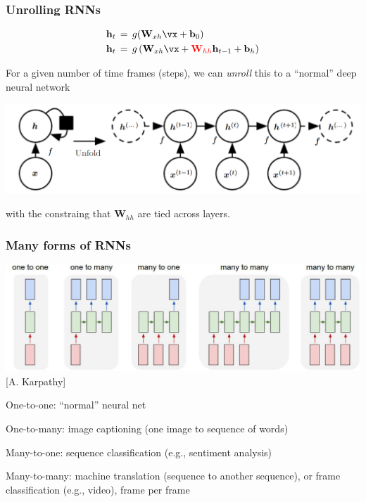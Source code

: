 \documentclass[xcolor=dvipsnames]{beamer}
\begin{document}
\begin{frame}
  \frametitle{Unrolling RNNs}
\begin{align*}
    \mathbf{h}_t\,&=\,g(\mathbf{W}_{xh}\vx+\mathbf{b}_0)\\
    \mathbf{h}_t\,&=\,g\left(\mathbf{W}_{xh}\vx+\textcolor{red}{\mathbf{W}_{hh}}\mathbf{h}_{t-1}+\mathbf{b}_h\right)
  \end{align*}
  \bi
\item For a given number of time frames (steps), we can \emph{unroll}
  this to a ``normal'' deep neural network

\includegraphics[width=.8\textwidth]{gcb-rnn-unfold}
\raisebox{1em}{\hspace{-4em}[Goodfellow et al.]}

with the constraing that $\mathbf{W}_{hh}$ are tied across layers.
\ei
\end{frame}

\begin{frame}
  \frametitle{Many forms of RNNs}

  \includegraphics[width=.95\textwidth]{ak-rnn-forms}\\

[A. Karpathy]
\bi
\item One-to-one: ``normal'' neural net
\item One-to-many: image captioning (one image to sequence of words)
\item Many-to-one: sequence classification (e.g., sentiment analysis)
\item Many-to-many: machine translation (sequence to another
  sequence), or frame classification (e.g., video), frame per frame
\ei
\end{frame}
\end{document}
